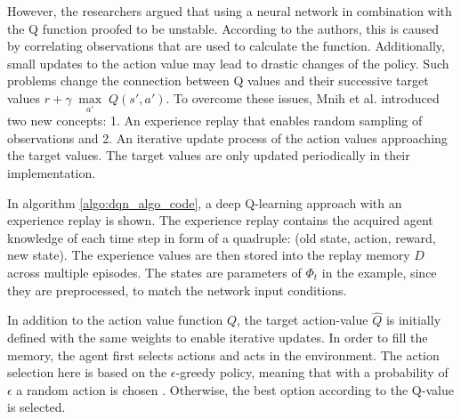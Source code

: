 However, the researchers argued that using a neural network in combination with the Q function proofed to be unstable. According to the authors, this is caused by correlating observations that are used to calculate the function. Additionally, small updates to the action value may lead to drastic changes of the policy. Such problems change the connection between Q values and their successive target values $r+\gamma \; \underset{a'} \max \; Q(s',a')$. To overcome these issues, Mnih et al. introduced two new concepts: 1. An experience replay that enables random sampling of observations and 2. An iterative update process of the action values approaching the target values. The target values are only updated periodically in their implementation.

In algorithm \ref{algo:dqn_algo_code}, a deep Q-learning approach with an experience replay is shown. The experience replay contains the acquired agent knowledge of each time step in form of a quadruple: (old state, action, reward, new state). The experience values are then stored into the replay memory $D$ across multiple episodes. The states are parameters of $\Phi_{t}$ in the example, since they are preprocessed, to match the network input conditions.

In addition to the action value function $Q$, the target action-value $\hat Q$ is initially defined with the same weights to enable iterative updates. In order to fill the memory, the agent first selects actions and acts in the environment. The action selection here is based on the $\epsilon$-greedy policy, meaning that with a probability of $\epsilon$ a random action is chosen \cite{mnka15}. Otherwise, the best option according to the Q-value is selected.


